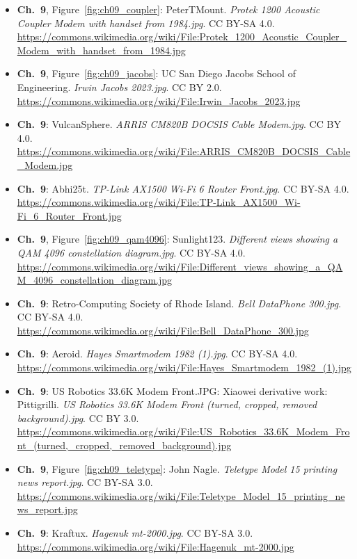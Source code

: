 \begin{small}
\begin{itemize}[leftmargin=0pt,itemsep=2pt,label={}]
\item \textbf{Ch.~9}, Figure~\ref{fig:ch09_coupler}: PeterTMount. \emph{Protek 1200 Acoustic Coupler Modem with handset from 1984.\allowbreak{}jpg}. CC BY-SA 4.0. \url{https://commons.wikimedia.org/wiki/File:Protek_1200_Acoustic_Coupler_Modem_with_handset_from_1984.jpg}
\item \textbf{Ch.~9}, Figure~\ref{fig:ch09_jacobs}: UC San Diego Jacobs School of Engineering. \emph{Irwin Jacobs 2023.\allowbreak{}jpg}. CC BY 2.0. \url{https://commons.wikimedia.org/wiki/File:Irwin_Jacobs_2023.jpg}
\item \textbf{Ch.~9}: VulcanSphere. \emph{ARRIS CM820B DOCSIS Cable Modem.\allowbreak{}jpg}. CC BY 4.0. \url{https://commons.wikimedia.org/wiki/File:ARRIS_CM820B_DOCSIS_Cable_Modem.jpg}
\item \textbf{Ch.~9}: Abhi25t. \emph{TP-\allowbreak{}Link AX1500 Wi-\allowbreak{}Fi 6 Router Front.\allowbreak{}jpg}. CC BY-SA 4.0. \url{https://commons.wikimedia.org/wiki/File:TP-Link_AX1500_Wi-Fi_6_Router_Front.jpg}
\item \textbf{Ch.~9}, Figure~\ref{fig:ch09_qam4096}: Sunlight123. \emph{Different views showing a QAM 4096 constellation diagram.\allowbreak{}jpg}. CC BY-SA 4.0. \url{https://commons.wikimedia.org/wiki/File:Different_views_showing_a_QAM_4096_constellation_diagram.jpg}
\item \textbf{Ch.~9}: Retro-Computing Society of Rhode Island. \emph{Bell DataPhone 300.\allowbreak{}jpg}. CC BY-SA 4.0. \url{https://commons.wikimedia.org/wiki/File:Bell_DataPhone_300.jpg}
\item \textbf{Ch.~9}: Aeroid. \emph{Hayes Smartmodem 1982 (1).\allowbreak{}jpg}. CC BY-SA 4.0. \url{https://commons.wikimedia.org/wiki/File:Hayes_Smartmodem_1982_(1).jpg}
\item \textbf{Ch.~9}: US Robotics 33.6K Modem Front.JPG: Xiaowei derivative work: Pittigrilli. \emph{US Robotics 33.\allowbreak{}6K Modem Front (turned, cropped, removed background).\allowbreak{}jpg}. CC BY 3.0. \url{https://commons.wikimedia.org/wiki/File:US_Robotics_33.6K_Modem_Front_(turned,_cropped,_removed_background).jpg}
\item \textbf{Ch.~9}, Figure~\ref{fig:ch09_teletype}: John Nagle. \emph{Teletype Model 15 printing news report.\allowbreak{}jpg}. CC BY-SA 3.0. \url{https://commons.wikimedia.org/wiki/File:Teletype_Model_15_printing_news_report.jpg}
\item \textbf{Ch.~9}: Kraftux. \emph{Hagenuk mt-\allowbreak{}2000.\allowbreak{}jpg}. CC BY-SA 3.0. \url{https://commons.wikimedia.org/wiki/File:Hagenuk_mt-2000.jpg}

\end{itemize}
\end{small}

